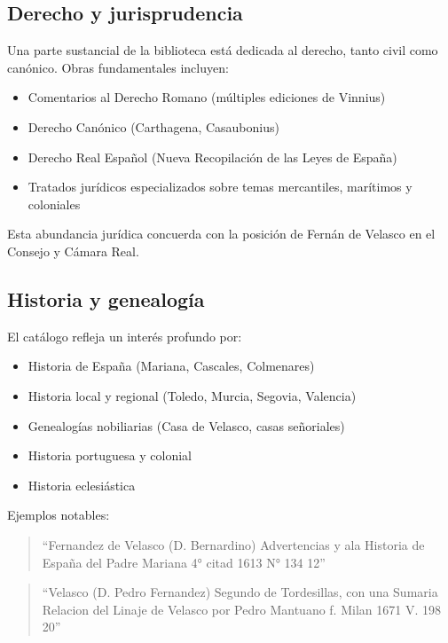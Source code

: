 \documentclass[12pt,a4paper]{article}
\begin{document}
\subsection{Derecho y jurisprudencia}

Una parte sustancial de la biblioteca está dedicada al derecho, tanto civil como canónico. Obras fundamentales incluyen:

\begin{itemize}
    \item Comentarios al Derecho Romano (múltiples ediciones de Vinnius)
    \item Derecho Canónico (Carthagena, Casaubonius)
    \item Derecho Real Español (Nueva Recopilación de las Leyes de España)
    \item Tratados jurídicos especializados sobre temas mercantiles, marítimos y coloniales
\end{itemize}

Esta abundancia jurídica concuerda con la posición de Fernán de Velasco en el Consejo y Cámara Real.

\subsection{Historia y genealogía}

El catálogo refleja un interés profundo por:

\begin{itemize}
    \item Historia de España (Mariana, Cascales, Colmenares)
    \item Historia local y regional (Toledo, Murcia, Segovia, Valencia)
    \item Genealogías nobiliarias (Casa de Velasco, casas señoriales)
    \item Historia portuguesa y colonial
    \item Historia eclesiástica
\end{itemize}

Ejemplos notables:

\begin{quote}
``Fernandez de Velasco (D. Bernardino) Advertencias y ala Historia de España del Padre Mariana 4° citad 1613 N° 134 12''
\end{quote}

\begin{quote}
``Velasco (D. Pedro Fernandez) Segundo de Tordesillas, con una Sumaria Relacion del Linaje de Velasco por Pedro Mantuano f. Milan 1671 V. 198 20''
\end{quote}
\end{document}
